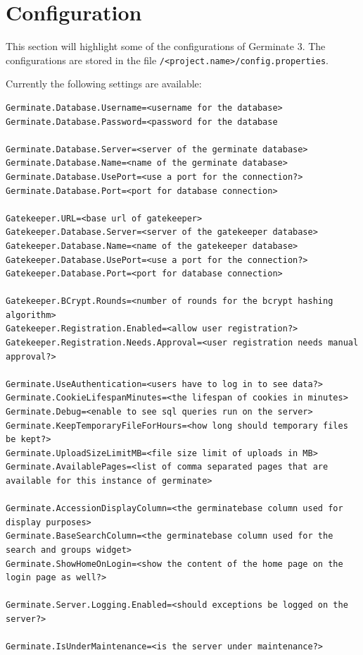 \section{Configuration}
\label{sec:config}
This section will highlight some of the configurations of Germinate 3. The configurations are stored in the file \texttt{\instanceStuff/<project.name>/config.properties}.

Currently the following settings are available:

\begin{lstlisting}[style=Properties]
Germinate.Database.Username=<username for the database>
Germinate.Database.Password=<password for the database

Germinate.Database.Server=<server of the germinate database>
Germinate.Database.Name=<name of the germinate database>
Germinate.Database.UsePort=<use a port for the connection?>
Germinate.Database.Port=<port for database connection>

Gatekeeper.URL=<base url of gatekeeper>
Gatekeeper.Database.Server=<server of the gatekeeper database>
Gatekeeper.Database.Name=<name of the gatekeeper database>
Gatekeeper.Database.UsePort=<use a port for the connection?>
Gatekeeper.Database.Port=<port for database connection>

Gatekeeper.BCrypt.Rounds=<number of rounds for the bcrypt hashing algorithm>
Gatekeeper.Registration.Enabled=<allow user registration?>
Gatekeeper.Registration.Needs.Approval=<user registration needs manual approval?>

Germinate.UseAuthentication=<users have to log in to see data?>
Germinate.CookieLifespanMinutes=<the lifespan of cookies in minutes>
Germinate.Debug=<enable to see sql queries run on the server>
Germinate.KeepTemporaryFileForHours=<how long should temporary files be kept?>
Germinate.UploadSizeLimitMB=<file size limit of uploads in MB>
Germinate.AvailablePages=<list of comma separated pages that are available for this instance of germinate>

Germinate.AccessionDisplayColumn=<the germinatebase column used for display purposes>
Germinate.BaseSearchColumn=<the germinatebase column used for the search and groups widget>
Germinate.ShowHomeOnLogin=<show the content of the home page on the login page as well?>

Germinate.Server.Logging.Enabled=<should exceptions be logged on the server?>

Germinate.IsUnderMaintenance=<is the server under maintenance?>


\end{lstlisting}
